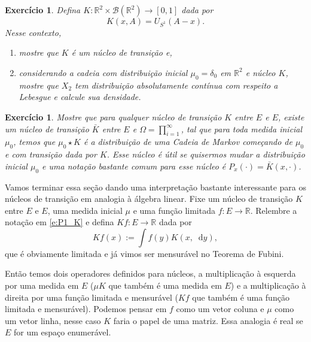 \documentclass[reqno]{article}
\newcommand*\1{\mathds{1}}
\newtheorem{exercise}[example]{Exercício}
\renewcommand*\d{\mathop{}\!\mathrm{d}}
\begin{document}
\begin{exercise}
  Defina $K:\mathbb{R}^2 \times \mathcal{B}(\mathbb{R}^2) \to [0,1]$ dada por
  \begin{equation}
    K(x, A) = U_{S^1}(A - x).
  \end{equation}
  Nesse contexto,
  \begin{enumerate}[\quad a)]
  \item mostre que $K$ é um núcleo de transição e,
  \item considerando a cadeia com distribuição inicial $\mu_0 = \delta_0$ em $\mathbb{R}^2$ e núcleo $K$, mostre que $X_2$ tem distribuição absolutamente contínua com respeito a Lebesgue e calcule sua densidade.
  \end{enumerate}
\end{exercise}

\begin{exercise}
  Mostre que para qualquer núcleo de transição $K$ entre $E$ e $E$, existe um núcleo de transição $\bar K$ entre $E$ e $\Omega = \prod_{i=1}^\infty$, tal que para toda medida inicial $\mu_0$, temos que $\mu_0 \star K$ é a distribuição de uma Cadeia de Markov começando de $\mu_0$ e com transição dada por $K$.
  Esse núcleo é útil se quisermos mudar a distribuição inicial $\mu_0$ e uma notação bastante comum para esse núcleo é $P_{x}(\cdot) = \bar K(x, \cdot)$.
\end{exercise}

Vamos terminar essa seção dando uma interpretação bastante interessante para os núcleos de transição em analogia à álgebra linear.
Fixe um núcleo de transição $K$ entre $E$ e $E$, uma medida inicial $\mu$ e uma função limitada $f: E \to \mathbb{R}$.
Relembre a notação em \eqref{e:P1_K} e defina $K f: E \to \mathbb{R}$ dada por
\begin{equation}
  K f(x):= \int f(y) K(x, \d y),
\end{equation}
que é obviamente limitada e já vimos ser mensurável no Teorema de Fubini.

Então temos dois operadores definidos para núcleos, a multiplicação à esquerda por uma medida em $E$ ($\mu K$ que também é uma medida em $E$) e a multiplicação à direita por uma função limitada e mensurável ($K f$ que também é uma função limitada e mensurável).
Podemos pensar em $f$ como um vetor coluna e $\mu$ como um vetor linha, nesse caso $K$ faria o papel de uma matriz.
Essa analogia é real se $E$ for um espaço enumerável.
\end{document}
